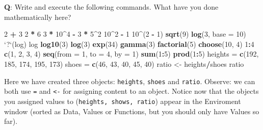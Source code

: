 \documentclass[]{article}
\newenvironment{Shaded}{\begin{snugshade}}{\end{snugshade}}
\newcommand{\KeywordTok}[1]{\textcolor[rgb]{0.13,0.29,0.53}{\textbf{#1}}}
\newcommand{\DataTypeTok}[1]{\textcolor[rgb]{0.13,0.29,0.53}{#1}}
\newcommand{\DecValTok}[1]{\textcolor[rgb]{0.00,0.00,0.81}{#1}}
\newcommand{\StringTok}[1]{\textcolor[rgb]{0.31,0.60,0.02}{#1}}
\newcommand{\OperatorTok}[1]{\textcolor[rgb]{0.81,0.36,0.00}{\textbf{#1}}}
\newcommand{\NormalTok}[1]{#1}
\begin{document}
\textbf{Q}: Write and execute the following commands. What have you done
mathematically here?

\begin{Shaded}
\begin{Highlighting}[]
\DecValTok{2} \OperatorTok{+}\StringTok{ }\DecValTok{3}
\DecValTok{2} \OperatorTok{*}\StringTok{ }\DecValTok{6}
\DecValTok{3} \OperatorTok{*}\StringTok{ }\DecValTok{10}\OperatorTok{^}\DecValTok{4} \OperatorTok{-}\StringTok{ }\DecValTok{3} \OperatorTok{*}\StringTok{ }\DecValTok{5}\OperatorTok{^}\DecValTok{2}
\DecValTok{10}\OperatorTok{^}\DecValTok{2} \OperatorTok{-}\StringTok{ }\DecValTok{1}
\DecValTok{10}\OperatorTok{^}\NormalTok{(}\DecValTok{2} \OperatorTok{-}\StringTok{ }\DecValTok{1}\NormalTok{)}
\KeywordTok{sqrt}\NormalTok{(}\DecValTok{9}\NormalTok{)}
\KeywordTok{log}\NormalTok{(}\DecValTok{3}\NormalTok{, }\DataTypeTok{base =} \DecValTok{10}\NormalTok{)}
\StringTok{`}\DataTypeTok{?}\StringTok{`}\NormalTok{(log)}
\NormalTok{log}
\KeywordTok{log10}\NormalTok{(}\DecValTok{3}\NormalTok{)}
\KeywordTok{log}\NormalTok{(}\DecValTok{3}\NormalTok{)}
\KeywordTok{exp}\NormalTok{(}\DecValTok{34}\NormalTok{)}
\KeywordTok{gamma}\NormalTok{(}\DecValTok{3}\NormalTok{)}
\KeywordTok{factorial}\NormalTok{(}\DecValTok{5}\NormalTok{)}
\KeywordTok{choose}\NormalTok{(}\DecValTok{10}\NormalTok{, }\DecValTok{4}\NormalTok{)}
\DecValTok{1}\OperatorTok{:}\DecValTok{4}
\KeywordTok{c}\NormalTok{(}\DecValTok{1}\NormalTok{, }\DecValTok{2}\NormalTok{, }\DecValTok{3}\NormalTok{, }\DecValTok{4}\NormalTok{)}
\KeywordTok{seq}\NormalTok{(}\DataTypeTok{from =} \DecValTok{1}\NormalTok{, }\DataTypeTok{to =} \DecValTok{4}\NormalTok{, }\DataTypeTok{by =} \DecValTok{1}\NormalTok{)}
\KeywordTok{sum}\NormalTok{(}\DecValTok{1}\OperatorTok{:}\DecValTok{5}\NormalTok{)}
\KeywordTok{prod}\NormalTok{(}\DecValTok{1}\OperatorTok{:}\DecValTok{5}\NormalTok{)}
\NormalTok{heights =}\StringTok{ }\KeywordTok{c}\NormalTok{(}\DecValTok{192}\NormalTok{, }\DecValTok{185}\NormalTok{, }\DecValTok{174}\NormalTok{, }\DecValTok{195}\NormalTok{, }\DecValTok{173}\NormalTok{)}
\NormalTok{shoes =}\StringTok{ }\KeywordTok{c}\NormalTok{(}\DecValTok{46}\NormalTok{, }\DecValTok{43}\NormalTok{, }\DecValTok{40}\NormalTok{, }\DecValTok{45}\NormalTok{, }\DecValTok{40}\NormalTok{)}
\NormalTok{ratio <-}\StringTok{ }\NormalTok{heights}\OperatorTok{/}\NormalTok{shoes}
\NormalTok{ratio}
\end{Highlighting}
\end{Shaded}

Here we have created three objects: \texttt{heights}, \texttt{shoes} and
\texttt{ratio}. Observe: we can both use \texttt{=} and
\texttt{\textless{}-} for assigning content to an object. Notice now
that the objects you assigned values to
(\texttt{heights,\ shows,\ ratio}) appear in the Enviroment window
(sorted as Data, Values or Functions, but you should only have Values so
far).
\end{document}
